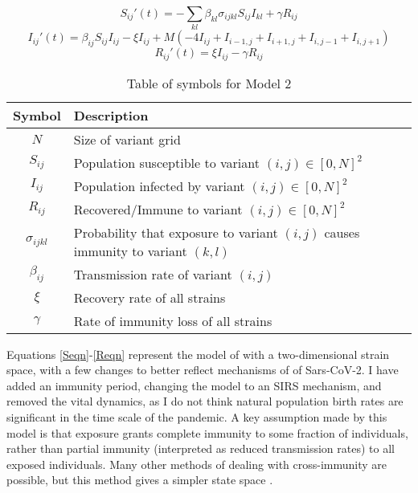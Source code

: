 \documentclass{article}
\begin{document}
\begin{equation}
    S_{ij}'(t) = -\sum_{kl} \beta_{kl} \sigma_{ijkl} S_{ij} I_{kl} + \gamma R_{ij}  \label{Seqn}
\end{equation}
\begin{equation}
    I_{ij}'(t) = \beta_{ij} S_{ij} I_{ij} - \xi I_{ij} + M \left(- 4I_{ij} + I_{i-1,j}  + I_{i+1,j} + I_{i,j-1} + I_{i,j+1} \right) \label{Ieqn}    
\end{equation}
\begin{equation}
    R_{ij}'(t) = \xi I_{ij} - \gamma R_{ij}  \label{Reqn}
\end{equation}


\begin{table}[h!]
    \begin{center}
        \begin{tabular}{c|p{8cm}}
            Symbol & Description \\
            \hline
            \hline
            $N$ & Size of variant grid \\
            $S_{ij}$ & Population susceptible to variant $(i,j) \in [0,N]^2$ \\
            $I_{ij}$ & Population infected by variant $(i,j) \in [0,N]^2$\\
            $R_{ij}$ & Recovered/Immune to variant $(i,j) \in [0,N]^2$\\
            $\sigma_{ijkl}$ & Probability that exposure to variant $(i,j)$ causes immunity \newline to variant $(k,l)$\\
            $\beta_{ij}$ & Transmission rate of variant $(i,j)$\\
            $\xi$ & Recovery rate of all strains \\
            $\gamma$ & Rate of immunity loss of all strains \\
    \end{tabular}
    \caption{Table of symbols for Model 2}

    \label{variables_2}
    \end{center}
\end{table}

    

Equations \ref{Seqn}-\ref{Reqn} represent the model of \cite{gogDynamicsSelectionManystrain2002} with a two-dimensional strain space, with a few changes to better reflect mechanisms of of Sars-CoV-2. I have added an immunity period, changing the model to an SIRS mechanism, and removed the vital dynamics, as I do not think natural population birth rates are significant in the time scale of the pandemic. A key assumption made by this model is that exposure grants complete immunity to some fraction of individuals, rather than partial immunity (interpreted as reduced transmission rates) to all exposed individuals. Many other methods of dealing with cross-immunity are possible, but this method gives a simpler state space \cite{Castillo_Chavez_Blower_Driessche_Kirschner_Yakubu_2002}.
\end{document}

